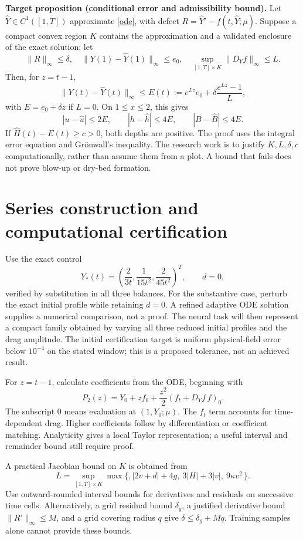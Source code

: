 \documentclass[12pt,a4paper]{article}
\begin{document}
\textbf{Target proposition (conditional error and admissibility bound).}
Let $\widehat Y\in C^1([1,T])$ approximate \eqref{ode}, with defect $R=\widehat Y'-f(t,\widehat Y;\mu)$. Suppose a compact convex region $K$ contains the approximation and a validated enclosure of the exact solution; let
\[
\|R\|_\infty\leq\delta,\quad
\|Y(1)-\widehat Y(1)\|_\infty\leq e_0,\quad
\sup_{[1,T]\times K}\|D_Yf\|_\infty\leq L.
\]
Then, for $z=t-1$,
\[
\|Y(t)-\widehat Y(t)\|_\infty\leq E(t)
 :=e^{Lz}e_0+\delta\frac{e^{Lz}-1}{L},
\]
with $E=e_0+\delta z$ if $L=0$. On $1\leq x\leq2$, this gives
\[
|u-\widehat u|\leq2E,\qquad
|h-\widehat h|\leq4E,\qquad |B-\widehat B|\leq4E.
\]
If $\widehat H(t)-E(t)\geq c>0$, both depths are positive. The proof uses the integral error equation and Gr\"onwall's inequality. The research work is to justify $K,L,\delta,c$ computationally, rather than assume them from a plot. A bound that fails does not prove blow-up or dry-bed formation.
\newpage
\section{Series construction and computational certification}
Use the exact control
\[
Y_*(t)=\left(\frac{2}{3t},\frac{1}{15t^2},\frac{2}{45t^2}\right)^T,\qquad d=0,
\]
verified by substitution in all three balances. For the substantive case, perturb the exact initial profile while retaining $d=0$. A refined adaptive ODE solution supplies a numerical comparison, not a proof. The neural task will then represent a compact family obtained by varying all three reduced initial profiles and the drag amplitude. The initial certification target is uniform physical-field error below $10^{-4}$ on the stated window; this is a proposed tolerance, not an achieved result.

For $z=t-1$, calculate coefficients from the ODE, beginning with
\[
P_2(z)=Y_0+zf_0+\frac{z^2}{2}(f_t+D_Yf\,f)_0.
\]
The subscript $0$ means evaluation at $(1,Y_0;\mu)$. The $f_t$ term accounts for time-dependent drag. Higher coefficients follow by differentiation or coefficient matching. Analyticity gives a local Taylor representation; a useful interval and remainder bound still require proof.

A practical Jacobian bound on $K$ is obtained from
\[
L=\sup_{[1,T]\times K}\max\{,|2v+d|+4g,\ 3|H|+3|v|,\ 9\kappa v^2\,\}.
\]
Use outward-rounded interval bounds for derivatives and residuals on successive time cells. Alternatively, a grid residual bound $\delta_g$, a justified derivative bound $\|R'\|_\infty\leq M$, and a grid covering radius $q$ give $\delta\leq\delta_g+Mq$. Training samples alone cannot provide these bounds.
\end{document}
